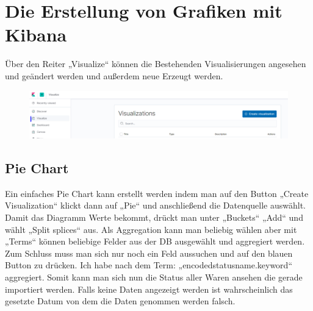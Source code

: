 \section{Die Erstellung von Grafiken mit Kibana}
Über den Reiter „Visualize“ können die Bestehenden Visualisierungen angesehen und geändert werden und außerdem neue Erzeugt werden.
\begin{figure}[H]
    \centering
    \includegraphics{images/vis_find.png}
\end{figure}
\subsection{Pie Chart}
Ein einfaches Pie Chart kann erstellt werden indem man auf den Button „Create Visualization“ klickt dann auf „Pie“ und anschließend die Datenquelle auswählt. Damit das Diagramm Werte bekommt, drückt man unter „Buckets“ „Add“ und wählt „Split splices“ aus. Als Aggregation kann man beliebig wählen aber mit „Terms“ können beliebige Felder aus der DB ausgewählt und aggregiert werden. Zum Schluss muss man sich nur noch ein Feld aussuchen und auf den blauen Button zu drücken. Ich habe nach dem Term: „encodedstatusname.keyword“ aggregiert. Somit kann man sich nun die Status aller Waren ansehen die gerade importiert werden. Falls keine Daten angezeigt werden ist wahrscheinlich das gesetzte Datum von dem die Daten genommen werden falsch.
